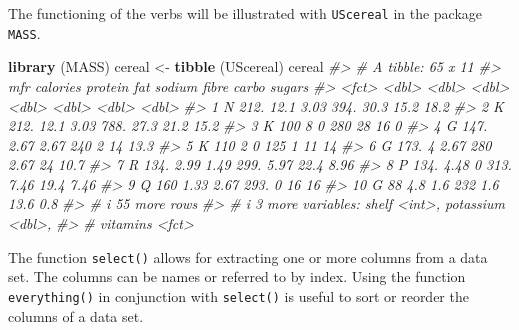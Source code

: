 \documentclass[
]{book}
\newenvironment{Shaded}{\begin{snugshade}}{\end{snugshade}}
\newcommand{\CommentTok}[1]{\textcolor[rgb]{0.56,0.35,0.01}{\textit{#1}}}
\newcommand{\FunctionTok}[1]{\textcolor[rgb]{0.13,0.29,0.53}{\textbf{#1}}}
\newcommand{\NormalTok}[1]{#1}
\newcommand{\OtherTok}[1]{\textcolor[rgb]{0.56,0.35,0.01}{#1}}
\begin{document}
The functioning of the verbs will be illustrated with \texttt{UScereal} in the package \texttt{MASS}.

\begin{Shaded}
\begin{Highlighting}[]
\FunctionTok{library}\NormalTok{ (MASS)}
\NormalTok{cereal }\OtherTok{\textless{}{-}} \FunctionTok{tibble}\NormalTok{ (UScereal)}
\NormalTok{cereal}
\CommentTok{\#\textgreater{} \# A tibble: 65 x 11}
\CommentTok{\#\textgreater{}    mfr   calories protein   fat sodium fibre carbo sugars}
\CommentTok{\#\textgreater{}    \textless{}fct\textgreater{}    \textless{}dbl\textgreater{}   \textless{}dbl\textgreater{} \textless{}dbl\textgreater{}  \textless{}dbl\textgreater{} \textless{}dbl\textgreater{} \textless{}dbl\textgreater{}  \textless{}dbl\textgreater{}}
\CommentTok{\#\textgreater{}  1 N         212.   12.1   3.03   394. 30.3   15.2  18.2 }
\CommentTok{\#\textgreater{}  2 K         212.   12.1   3.03   788. 27.3   21.2  15.2 }
\CommentTok{\#\textgreater{}  3 K         100     8     0      280  28     16     0   }
\CommentTok{\#\textgreater{}  4 G         147.    2.67  2.67   240   2     14    13.3 }
\CommentTok{\#\textgreater{}  5 K         110     2     0      125   1     11    14   }
\CommentTok{\#\textgreater{}  6 G         173.    4     2.67   280   2.67  24    10.7 }
\CommentTok{\#\textgreater{}  7 R         134.    2.99  1.49   299.  5.97  22.4   8.96}
\CommentTok{\#\textgreater{}  8 P         134.    4.48  0      313.  7.46  19.4   7.46}
\CommentTok{\#\textgreater{}  9 Q         160     1.33  2.67   293.  0     16    16   }
\CommentTok{\#\textgreater{} 10 G          88     4.8   1.6    232   1.6   13.6   0.8 }
\CommentTok{\#\textgreater{} \# i 55 more rows}
\CommentTok{\#\textgreater{} \# i 3 more variables: shelf \textless{}int\textgreater{}, potassium \textless{}dbl\textgreater{},}
\CommentTok{\#\textgreater{} \#   vitamins \textless{}fct\textgreater{}}
\end{Highlighting}
\end{Shaded}

The function \texttt{select()} allows for extracting one or more columns from a data set. The columns can be names or referred to by index. Using the function \texttt{everything()} in conjunction with \texttt{select()} is useful to sort or reorder the columns of a data set.
\end{document}
